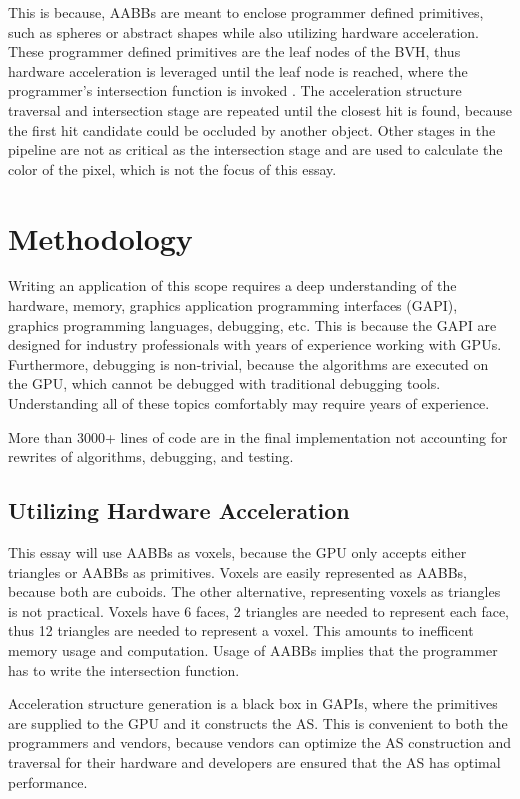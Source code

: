 \documentclass[12pt]{article}
\begin{document}
This is because, AABBs are meant to enclose programmer defined primitives, such as spheres or abstract shapes while also utilizing hardware acceleration.
These programmer defined primitives are the leaf nodes of the BVH, thus hardware acceleration is leveraged until the leaf node is reached, where the programmer's intersection function is invoked
\parencite{NVIDIA:BVH-Patent}.
The acceleration structure traversal and intersection stage are repeated until the closest hit is found, because the first hit candidate could be occluded by another object.
Other stages in the pipeline are not as critical as the intersection stage and are used to calculate the color of the pixel, which is not the focus of this essay.

\parencite{NVIDIA:RTGems2}

\section{Methodology}

Writing an application of this scope requires a deep understanding of the hardware, memory, graphics application programming interfaces (GAPI), graphics programming languages, debugging, etc.
This is because the GAPI are designed for industry professionals with years of experience working with GPUs.
Furthermore, debugging is non-trivial, because the algorithms are executed on the GPU, which cannot be debugged with traditional debugging tools.
Understanding all of these topics comfortably may require years of experience.

More than 3000+ lines of code are in the final implementation not accounting for rewrites of algorithms, debugging, and testing.

\subsection{Utilizing Hardware Acceleration}

This essay will use AABBs as voxels, because the GPU only accepts either triangles or AABBs as primitives.
Voxels are easily represented as AABBs, because both are cuboids.
The other alternative, representing voxels as triangles is not practical. Voxels have 6 faces, 2 triangles
are needed to represent each face, thus 12 triangles are needed to represent a voxel. This amounts to
inefficent memory usage and computation. Usage of AABBs implies that the programmer has to write the intersection function.

Acceleration structure generation is a black box in GAPIs, where
the primitives are supplied to the GPU and it constructs the AS. This is convenient to both the programmers and vendors, because
vendors can optimize the AS construction and traversal for their hardware and developers are ensured that the AS has optimal performance.
\end{document}
